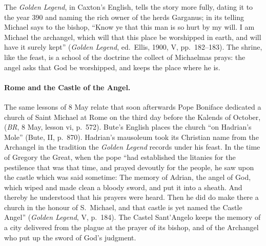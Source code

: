 The \emph{Golden Legend}, in Caxton's English, tells the story more
fully, dating it to the year 390 and naming the rich owner of the herds
Garganus; in its telling Michael says to the bishop, ``Know ye that this
man is so hurt by my will. I am Michael the archangel, which will that
this place be worshipped in earth, and will have it surely kept''
(\emph{Golden Legend}, ed.\ Ellis, 1900, V, pp.~182--183). The shrine, like
the feast, is a school of the doctrine the collect of Michaelmas prays:
the angel asks that God be worshipped, and keeps the place where he is.

\paragraph{Rome and the Castle of the Angel.} The same lessons of 8 May
relate that soon afterwards Pope Boniface dedicated a church of Saint
Michael at Rome on the third day before the Kalends of October,
 (\emph{BR}, 8 May, lesson vi, p.~572). Bute's
English places the church ``on Hadrian's Mole'' (Bute, II, p.~870).
Hadrian's mausoleum took its Christian name from the Archangel in the
tradition the \emph{Golden Legend} records under his feast. In the time
of Gregory the Great, when the pope ``had established the litanies for the
pestilence that was that time, and prayed devoutly for the people, he saw
upon the castle which was said sometime: The memory of Adrian, the angel
of God, which wiped and made clean a bloody sword, and put it into a
sheath. And thereby he understood that his prayers were heard. Then he
did do make there a church in the honour of S.\ Michael, and that castle
is yet named the Castle Angel'' (\emph{Golden Legend}, V, p.~184). The
Castel Sant'Angelo keeps the memory of a city delivered from the plague
at the prayer of its bishop, and of the Archangel who put up the sword of
God's judgment.

